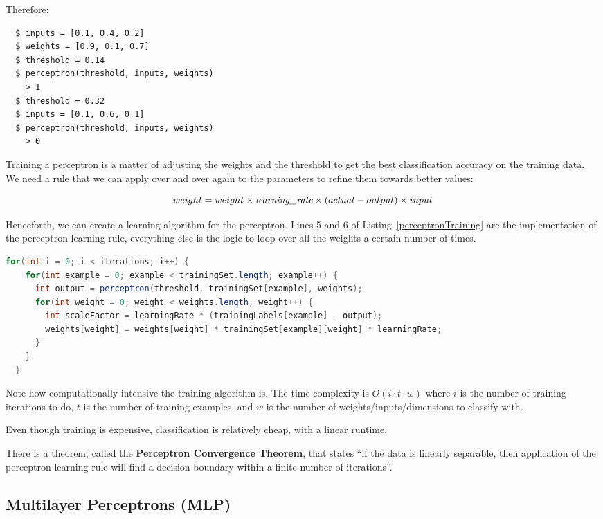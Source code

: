 Therefore:

\begin{verbatim}
  $ inputs = [0.1, 0.4, 0.2]
  $ weights = [0.9, 0.1, 0.7]
  $ threshold = 0.14
  $ perceptron(threshold, inputs, weights)
    > 1
  $ threshold = 0.32
  $ inputs = [0.1, 0.6, 0.1]
  $ perceptron(threshold, inputs, weights)
    > 0
\end{verbatim}

Training a perceptron is a matter of adjusting the weights and the threshold to
get the best classification accuracy on the training data. We need a rule that
we can apply over and over again to the parameters to refine them towards better
values:

\[
  weight = weight \times \text{\it learning\_rate} \times (actual - output) \times input
\]

Henceforth, we can create a learning algorithm for the perceptron. Lines 5 and 6
of Listing~\ref{perceptronTraining} are the implementation of the perceptron
learning rule, everything else is the logic to loop over all the weights a
certain number of times.

\begin{lstlisting}[language=java, label=perceptronTraining,
                   caption=A perceptron learning algorithm in Java]
  for(int i = 0; i < iterations; i++) {
    for(int example = 0; example < trainingSet.length; example++) {
      int output = perceptron(threshold, trainingSet[example], weights);
      for(int weight = 0; weight < weights.length; weight++) {
        int scaleFactor = learningRate * (trainingLabels[example] - output);
        weights[weight] = weights[weight] * trainingSet[example][weight] * learningRate;
      }
    }
  }
\end{lstlisting}

Note how computationally intensive the training algorithm is. The time
complexity is $O(i \cdot t \cdot w)$ where $i$ is the number of training
iterations to do, $t$ is the number of training examples, and $w$ is the number
of weights/inputs/dimensions to classify with.

Even though training is expensive, classification is relatively cheap, with a
linear runtime.

There is a theorem, called the \textbf{Perceptron Convergence Theorem}, that
states ``if the data is linearly separable, then application of the perceptron
learning rule will find a decision boundary within a finite number of
iterations''.

\subsection{Multilayer Perceptrons (MLP)}

